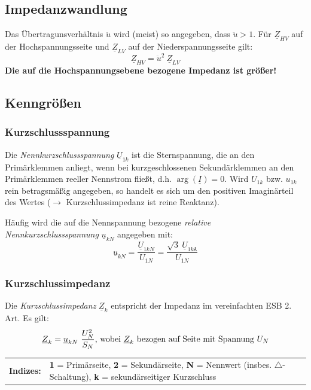\documentclass[11pt]{article}
\begin{document}
\subsection*{Impedanzwandlung}
Das Übertragunsverhältnis $\ddot u$ wird (meist) so angegeben, dass $\ddot u > 1$. Für $\underline Z_{HV}$ auf der Hochspannungsseite und $\underline Z_{LV}$ auf der Niederspannungsseite gilt:
\[
	\underline Z_{HV} = \ddot u^2 ~ \underline Z_{LV}
\]
\textbf{Die auf die Hochspannungsebene bezogene Impedanz ist größer!}

\subsection*{Kenngrößen}
\subsubsection*{Kurzschlussspannung}
Die \textit{Nennkurzschlussspannung} $\underline U_{1k}$ ist die Sternspannung, die an den Primärklemmen anliegt, wenn bei kurzgeschlossenen Sekundärklemmen an den Primärklemmen reeller Nennstrom fließt, d.h. $\arg(\underline I) = 0$. Wird $U_{1k}$ bzw. $u_{1k}$ rein betragsmäßig angegeben, so handelt es sich um den positiven Imaginärteil des Wertes ($\rightarrow$ Kurzschlussimpedanz ist reine Reaktanz).

\vspace{.5em}
Häufig wird die auf die Nennspannung bezogene \textit{relative Nennkurzschlussspannung} $\underline u_{kN}$ angegeben mit:
\[
	\underline u_{kN} = \frac{\underline U_{1kN}}{U_{1N}} = \frac{\sqrt{3} ~ \underline U_{1k\Yup}}{U_{1N}}
\]

\subsubsection*{Kurzschlussimpedanz}
Die \textit{Kurzschlussimpedanz} $\underline Z_k$ entspricht der Impedanz im vereinfachten ESB 2. Art. Es gilt:
\[
	\underline Z_k = \underline u_{kN} ~ \frac{U_N^2}{S_N} \textnormal{, wobei $\underline Z_k$ bezogen auf Seite mit Spannung $U_N$}
\]

\raggedright
\vspace{12pt}
\footnotesize
\begin{tabular}{r p{13cm}}
	\sffamily\textbf{Indizes:} & \rmfamily \textbf{1} = Primärseite, \textbf{2} = Sekundärseite, \textbf{N} = Nennwert (insbes. $\triangle$-Schaltung), \textbf{k} = sekundärseitiger Kurzschluss
\end{tabular}
\normalsize
\end{document}
